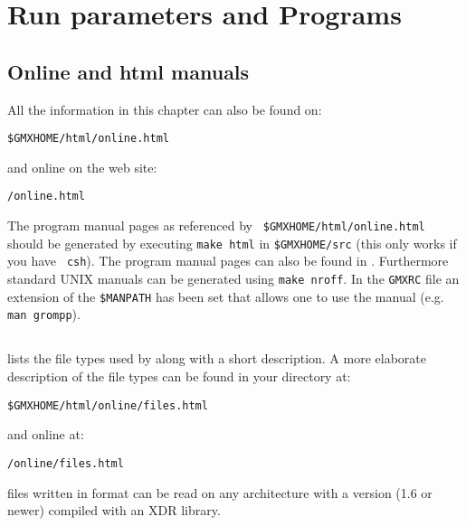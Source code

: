 %
% 
% 
% 
% 
% 
% 
% 
% 
%

\chapter{Run parameters and Programs}
\label{ch:programs}

\section{Online and html manuals}
All the information in this chapter can also be found on:\\
\centerline{\tt \$GMXHOME/html/online.html}
and online on the {\gromacs} web site:\\
\centerline{\tt \wwwpage/online\gmxver.html}
The program manual pages as referenced by {\tt
\$GMXHOME/html/online.html} should be generated by executing {\tt make
html} in {\tt \$GMXHOME/src} (this only works if you have {\tt
csh}). The program manual pages can also be found in
. Furthermore standard UNIX manuals can be generated using
{\tt make nroff}. In the {\tt GMXRC} file an extension of the {\tt \$MANPATH} 
has been set that allows one to use the manual (e.g. {\tt man grompp}).

\section{}
\label{sec:fileformats}
 lists the file types used by {\gromacs} along with
a short description. A more elaborate description of the file types can
be found in your {\gromacs} directory at:\\
\centerline{\tt \$GMXHOME/html/online/files.html}
and online at:\\
\centerline{\tt {\wwwpage}/online\gmxver/files.html}

{\gromacs} files written in  format can be read on any
architecture with a {\gromacs} version (1.6 or newer) compiled with an
XDR library.



